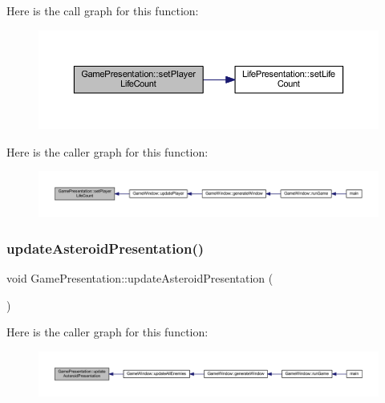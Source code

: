 Here is the call graph for this function\+:\nopagebreak
\begin{figure}[H]
\begin{center}
\leavevmode
\includegraphics[width=350pt]{class_game_presentation_a5a329f0403011b464c26218eeff38606_cgraph}
\end{center}
\end{figure}
Here is the caller graph for this function\+:\nopagebreak
\begin{figure}[H]
\begin{center}
\leavevmode
\includegraphics[width=350pt]{class_game_presentation_a5a329f0403011b464c26218eeff38606_icgraph}
\end{center}
\end{figure}
\mbox{\label{class_game_presentation_a669fe49aef6332f78a23802cafa6681c}} 
\subsubsection{\texorpdfstring{update\+Asteroid\+Presentation()}{updateAsteroidPresentation()}}
{\footnotesize\ttfamily void Game\+Presentation\+::update\+Asteroid\+Presentation (\begin{DoxyParamCaption}{ }\end{DoxyParamCaption})}

Here is the caller graph for this function\+:\nopagebreak
\begin{figure}[H]
\begin{center}
\leavevmode
\includegraphics[width=350pt]{class_game_presentation_a669fe49aef6332f78a23802cafa6681c_icgraph}
\end{center}
\end{figure}
\mbox{\label{class_game_presentation_a4ab96a6022c08f34aefa62f9a30c1cd8}} 
